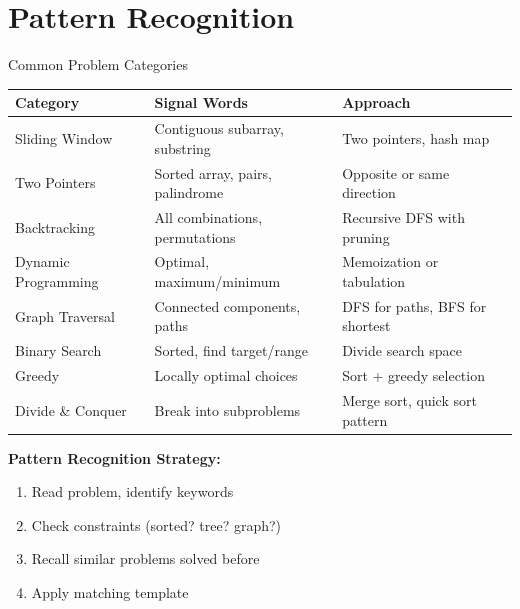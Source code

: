 \documentclass[aspectratio=169,xcolor=dvipsnames]{beamer}
\begin{document}
\section{Pattern Recognition}

\begin{frame}{Common Problem Categories}
  \begin{table}
    \centering
    \tiny
    \begin{tabular}{lll}
      \hline
      \textbf{Category} & \textbf{Signal Words} & \textbf{Approach} \\
      \hline
      Sliding Window & Contiguous subarray, substring & Two pointers, hash map \\
      Two Pointers & Sorted array, pairs, palindrome & Opposite or same direction \\
      Backtracking & All combinations, permutations & Recursive DFS with pruning \\
      Dynamic Programming & Optimal, maximum/minimum & Memoization or tabulation \\
      Graph Traversal & Connected components, paths & DFS for paths, BFS for shortest \\
      Binary Search & Sorted, find target/range & Divide search space \\
      Greedy & Locally optimal choices & Sort + greedy selection \\
      Divide \& Conquer & Break into subproblems & Merge sort, quick sort pattern \\
      \hline
    \end{tabular}
  \end{table}

  \vspace{0.3cm}
  \textbf{Pattern Recognition Strategy:}
  \begin{enumerate}
    \item Read problem, identify keywords
    \item Check constraints (sorted? tree? graph?)
    \item Recall similar problems solved before
    \item Apply matching template
  \end{enumerate}
\end{frame}
\end{document}
